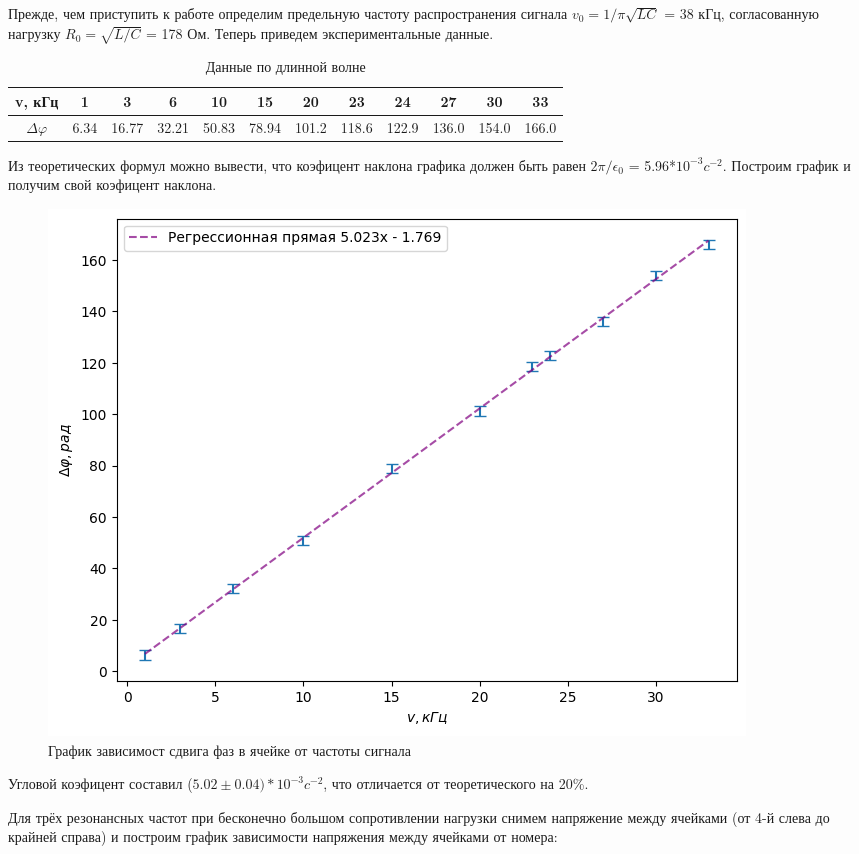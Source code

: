\documentclass[a4paper,12pt]{article} %
\begin{document}
Прежде, чем приступить к работе определим предельную частоту распространения сигнала $v_0 = 1/\pi\sqrt{LC}$ = 38 кГц, согласованную нагрузку $R_0 = \sqrt{L/C}$ = 178 Ом. Теперь приведем экспериментальные данные.


\begin{table}[H]
    \centering
    \begin{tabular}{|c|c|c|c|c|c|c|c|c|c|c|c|} \hline
         v, кГц& 1 & 3 & 6 & 10 & 15 & 20 & 23 & 24 & 27 & 30 & 33\\ \hline
         $\Delta \varphi$& 6.34 & 16.77 & 32.21 & 50.83 & 78.94 & 101.2 & 118.6 & 122.9 & 136.0&154.0&166.0\\ \hline
    \end{tabular}
    \caption{Данные  по длинной волне}
\end{table}

Из теоретических формул можно вывести, что коэфицент наклона графика должен быть равен $2\pi/\epsilon_0$ = 5.96*$10^{-3}c^{-2}.$ Построим график и получим свой коэфицент наклона. 


\begin{figure}[H]
    \centering
    \includegraphics[width=0.7\linewidth]{plot/fig6.png}
    \caption{График зависимост сдвига фаз в ячейке от частоты сигнала}
\end{figure}

Угловой коэфицент составил ($5.02 \pm 0.04) * 10^{-3}c^{-2}$, что отличается от теоретического на 20\%. 

Для трёх резонансных частот при бесконечно большом сопротивлении нагрузки снимем напряжение между ячейками (от 4-й слева до крайней справа) и построим график зависимости напряжения между ячейками от номера:
\end{document}
